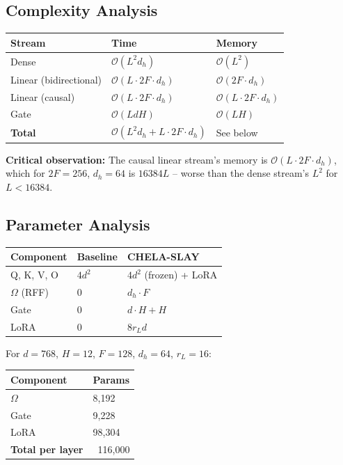 \subsection{Complexity Analysis}

\begin{table}[H]
\centering
\small
\begin{tabular}{lll}
\toprule
\textbf{Stream} & \textbf{Time} & \textbf{Memory} \\
\midrule
Dense & $\mathcal{O}(L^2 d_h)$ & $\mathcal{O}(L^2)$ \\
Linear (bidirectional) & $\mathcal{O}(L \cdot 2F \cdot d_h)$ & $\mathcal{O}(2F \cdot d_h)$ \\
Linear (causal) & $\mathcal{O}(L \cdot 2F \cdot d_h)$ & $\mathcal{O}(L \cdot 2F \cdot d_h)$ \\
Gate & $\mathcal{O}(L d H)$ & $\mathcal{O}(L H)$ \\
\textbf{Total} & $\mathcal{O}(L^2 d_h + L \cdot 2F \cdot d_h)$ & See below \\
\bottomrule
\end{tabular}
\end{table}

\textbf{Critical observation:} The causal linear stream's memory is 
$\mathcal{O}(L \cdot 2F \cdot d_h)$, which for $2F = 256$, $d_h = 64$ is 
$16384 L$ -- worse than the dense stream's $L^2$ for $L < 16384$.

\subsection{Parameter Analysis}

\begin{table}[H]
\centering
\small
\begin{tabular}{lll}
\toprule
\textbf{Component} & \textbf{Baseline} & \textbf{CHELA-SLAY} \\
\midrule
Q, K, V, O & $4 d^2$ & $4 d^2$ (frozen) + LoRA \\
$\Omega$ (RFF) & 0 & $d_h \cdot F$ \\
Gate & 0 & $d \cdot H + H$ \\
LoRA & 0 & $8 r_L d$ \\
\bottomrule
\end{tabular}
\end{table}

For $d = 768$, $H = 12$, $F = 128$, $d_h = 64$, $r_L = 16$:

\begin{table}[H]
\centering
\small
\begin{tabular}{ll}
\toprule
\textbf{Component} & \textbf{Params} \\
\midrule
$\Omega$ & 8,192 \\
Gate & 9,228 \\
LoRA & 98,304 \\
\textbf{Total per layer} & ~116,000 \\
\bottomrule
\end{tabular}
\end{table}

